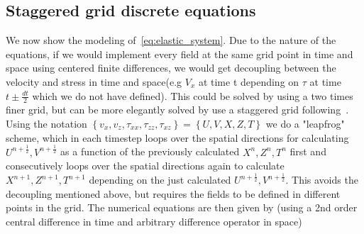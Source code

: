 \documentclass[10pt]{SelfArx} %
\theoremstyle{definition}
\begin{document}
\subsection{Staggered grid discrete equations}
We now show the modeling of~\cref{eq:elastic_system}.
Due to the nature of the equations, if we would implement every field at the same grid point in time and space using centered finite differences, we would get decoupling between the velocity and stress in time and space(e.g $V_x$ at time t depending on $\tau$ at time $t \pm \frac{dt}{2}$ which we do not have defined).
This could be solved by using a two times finer grid, but can be more elegantly solved by use a staggered grid following~\cite{Virieux1984}.
Using the notation $\left\{v_x, v_z, \tau_{xx}, \tau_{zz}, \tau_{xz}\right\} = \left\{U, V, X, Z, T \right\}$ we do a "leapfrog" scheme, which in each timestep loops over the spatial directions for calculating $U^{n+\frac{1}{2}},V^{n+\frac{1}{2}}$ as a function of the previously calculated $X^n, Z^n, T^n$ first and consecutively loops over the spatial directions again to calculate $X^{n+1}, Z^{n+1}, T^{n+1}$ depending on the just calculated $U^{n+\frac{1}{2}},V^{n+\frac{1}{2}}$. 
This avoids the decoupling mentioned above, but requires the fields to be defined in different points in the grid.
The numerical equations are then given by (using a 2nd order central difference in time and arbitrary difference operator in space)
\end{document}
